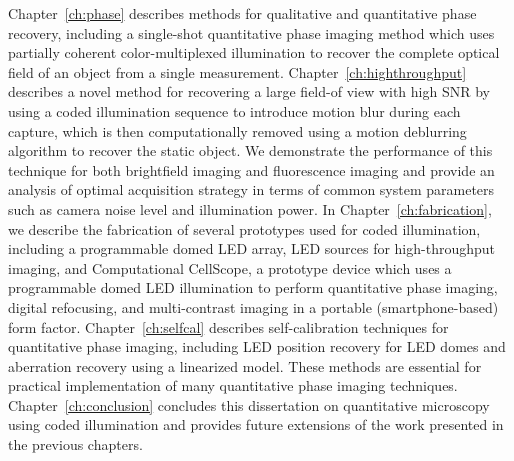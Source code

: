 Chapter~\ref{ch:phase} describes methods for qualitative and quantitative phase recovery, including a single-shot quantitative phase imaging method which uses partially coherent color-multiplexed illumination to recover the complete optical field of an object from a single measurement. Chapter~\ref{ch:highthroughput} describes a novel method for recovering a large field-of view with high SNR by using a coded illumination sequence to introduce motion blur during each capture, which is then computationally removed using a motion deblurring algorithm to recover the static object. We demonstrate the performance of this technique for both brightfield imaging and fluorescence imaging and provide an analysis of optimal acquisition strategy in terms of common system parameters such as camera noise level and illumination power. In Chapter~\ref{ch:fabrication}, we describe the fabrication of several prototypes used for coded illumination, including a programmable domed LED array, LED sources for high-throughput imaging, and Computational CellScope, a prototype device which uses a programmable domed LED illumination to perform quantitative phase imaging, digital refocusing, and multi-contrast imaging in a portable (smartphone-based) form factor. Chapter~\ref{ch:selfcal} describes self-calibration techniques for quantitative phase imaging, including LED position recovery for LED domes and aberration recovery using a linearized model. These methods are essential for practical implementation of many quantitative phase imaging techniques. Chapter~\ref{ch:conclusion} concludes this dissertation on quantitative microscopy using coded illumination and provides future extensions of the work presented in the previous chapters.

